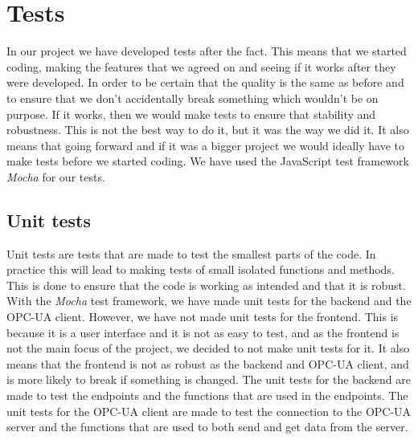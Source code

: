 \section{Tests}

In our project we have developed tests after the fact.
This means that we started coding, making the features that we agreed on
and seeing if it works after they were developed.
In order to be certain that the quality is the same as before
and to ensure that we don't accidentally break something which wouldn't be on purpose.
If it works, then we would make tests to ensure that stability and robustness.
This is not the best way to do it, but it was the way we did it.
It also means that going forward and if it was a bigger project
we would ideally have to make tests before we started coding.
We have used the JavaScript test framework \textit{Mocha} for our tests.

\subsection{Unit tests}

Unit tests are tests that are made to test the smallest parts of the code.
In practice this will lead to making tests of small isolated functions and methods.
This is done to ensure that the code is working as intended and that it is robust.
With the \textit{Mocha} test framework, we have made unit tests for the backend and the OPC-UA client.
However, we have not made unit tests for the frontend.
This is because it is a user interface and it is not as easy to test, and as the frontend is not the main focus of the project, we decided to not make unit tests for it.
It also means that the frontend is not as robust as the backend and OPC-UA client, and is more likely to break if something is changed.
The unit tests for the backend are made to test the endpoints and the functions that are used in the endpoints.
The unit tests for the OPC-UA client are made to test the connection to the OPC-UA server and the functions that are used to both send and get data from the server. \newline

